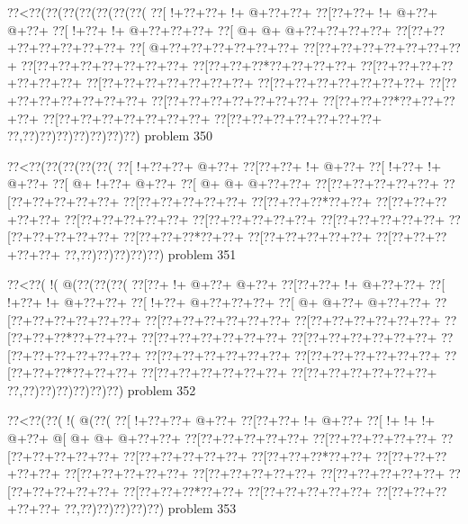 \vbox{\vbox{\goo
\0??<\0??(\0??(\0??(\0??(\0??(\0??(\0??(
\0??[\- !+\0??+\0??+\- !+\- @+\0??+\0??+
\0??[\0??+\0??+\- !+\- @+\0??+\- @+\0??+
\0??[\- !+\0??+\- !+\- @+\0??+\0??+\0??+
\0??[\- @+\- @+\- @+\0??+\0??+\0??+\0??+
\0??[\0??+\0??+\0??+\0??+\0??+\0??+\0??+
\0??[\- @+\0??+\0??+\0??+\0??+\0??+\0??+
\0??[\0??+\0??+\0??+\0??+\0??+\0??+\0??+
\0??[\0??+\0??+\0??+\0??+\0??+\0??+\0??+
\0??[\0??+\0??+\0??*\0??+\0??+\0??+\0??+
\0??[\0??+\0??+\0??+\0??+\0??+\0??+\0??+
\0??[\0??+\0??+\0??+\0??+\0??+\0??+\0??+
\0??[\0??+\0??+\0??+\0??+\0??+\0??+\0??+
\0??[\0??+\0??+\0??+\0??+\0??+\0??+\0??+
\0??[\0??+\0??+\0??+\0??+\0??+\0??+\0??+
\0??[\0??+\0??+\0??*\0??+\0??+\0??+\0??+
\0??[\0??+\0??+\0??+\0??+\0??+\0??+\0??+
\0??[\0??+\0??+\0??+\0??+\0??+\0??+\0??+
\0??,\0??)\0??)\0??)\0??)\0??)\0??)\0??)
}
\hfil problem 350\hfil\break
}

\vbox{\vbox{\goo
\0??<\0??(\0??(\0??(\0??(\0??(
\0??[\- !+\0??+\0??+\- @+\0??+
\0??[\0??+\0??+\- !+\- @+\0??+
\0??[\- !+\0??+\- !+\- @+\0??+
\0??[\- @+\- !+\0??+\- @+\0??+
\0??[\- @+\- @+\- @+\0??+\0??+
\0??[\0??+\0??+\0??+\0??+\0??+
\0??[\0??+\0??+\0??+\0??+\0??+
\0??[\0??+\0??+\0??+\0??+\0??+
\0??[\0??+\0??+\0??*\0??+\0??+
\0??[\0??+\0??+\0??+\0??+\0??+
\0??[\0??+\0??+\0??+\0??+\0??+
\0??[\0??+\0??+\0??+\0??+\0??+
\0??[\0??+\0??+\0??+\0??+\0??+
\0??[\0??+\0??+\0??+\0??+\0??+
\0??[\0??+\0??+\0??*\0??+\0??+
\0??[\0??+\0??+\0??+\0??+\0??+
\0??[\0??+\0??+\0??+\0??+\0??+
\0??,\0??)\0??)\0??)\0??)\0??)
}
\hfil problem 351\hfil\break
}

\vbox{\vbox{\goo
\0??<\0??(\- !(\- @(\0??(\0??(\0??(
\0??[\0??+\- !+\- @+\0??+\- @+\0??+
\0??[\0??+\0??+\- !+\- @+\0??+\0??+
\0??[\- !+\0??+\- !+\- @+\0??+\0??+
\0??[\- !+\0??+\- @+\0??+\0??+\0??+
\0??[\- @+\- @+\0??+\- @+\0??+\0??+
\0??[\0??+\0??+\0??+\0??+\0??+\0??+
\0??[\0??+\0??+\0??+\0??+\0??+\0??+
\0??[\0??+\0??+\0??+\0??+\0??+\0??+
\0??[\0??+\0??+\0??*\0??+\0??+\0??+
\0??[\0??+\0??+\0??+\0??+\0??+\0??+
\0??[\0??+\0??+\0??+\0??+\0??+\0??+
\0??[\0??+\0??+\0??+\0??+\0??+\0??+
\0??[\0??+\0??+\0??+\0??+\0??+\0??+
\0??[\0??+\0??+\0??+\0??+\0??+\0??+
\0??[\0??+\0??+\0??*\0??+\0??+\0??+
\0??[\0??+\0??+\0??+\0??+\0??+\0??+
\0??[\0??+\0??+\0??+\0??+\0??+\0??+
\0??,\0??)\0??)\0??)\0??)\0??)\0??)
}
\hfil problem 352\hfil\break
}

\vbox{\vbox{\goo
\0??<\0??(\0??(\- !(\- @(\0??(
\0??[\- !+\0??+\0??+\- @+\0??+
\0??[\0??+\0??+\- !+\- @+\0??+
\0??[\- !+\- !+\- !+\- @+\0??+
\- @[\- @+\- @+\- @+\0??+\0??+
\0??[\0??+\0??+\0??+\0??+\0??+
\0??[\0??+\0??+\0??+\0??+\0??+
\0??[\0??+\0??+\0??+\0??+\0??+
\0??[\0??+\0??+\0??+\0??+\0??+
\0??[\0??+\0??+\0??*\0??+\0??+
\0??[\0??+\0??+\0??+\0??+\0??+
\0??[\0??+\0??+\0??+\0??+\0??+
\0??[\0??+\0??+\0??+\0??+\0??+
\0??[\0??+\0??+\0??+\0??+\0??+
\0??[\0??+\0??+\0??+\0??+\0??+
\0??[\0??+\0??+\0??*\0??+\0??+
\0??[\0??+\0??+\0??+\0??+\0??+
\0??[\0??+\0??+\0??+\0??+\0??+
\0??,\0??)\0??)\0??)\0??)\0??)
}
\hfil problem 353\hfil\break
}

